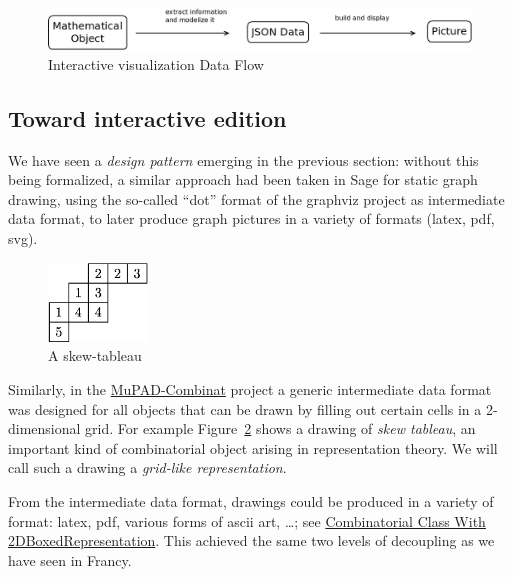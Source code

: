 \documentclass{deliverablereport}
\begin{document}
\begin{figure}[h]
  \begin{center}
    \includegraphics[width=\textwidth]{schemas/SensUnique}
  \end{center}
  \caption{Interactive visualization Data Flow}
  \label{fig:dataflow1}
\end{figure}




\subsection{Toward interactive edition}
\label{section:editing}

We have seen a \emph{design pattern} emerging in the previous section:
without this being formalized, a similar approach had been taken in
Sage for static graph drawing, using the so-called ``dot'' format of
the graphviz project as intermediate data format, to later produce
graph pictures in a variety of formats (latex, pdf, svg).

\begin{figure}
  \includegraphics[width=100px]{images/JDTSlide}
  \caption{A skew-tableau}
  \label{fig:skew_tableau}
\end{figure}
Similarly, in the
\href{http://mupad-combinat.sourceforge.net}{MuPAD-Combinat} project a
generic intermediate data format was designed for all objects that can
be drawn by filling out certain cells in a 2-dimensional grid. For
example Figure~\ref{fig:skew_tableau} shows a drawing of \emph{skew
  tableau}, an important kind of combinatorial object arising in
representation theory.
We will call such a drawing a \emph{grid-like representation}.


From the intermediate data format, drawings could be produced in a
variety of format: latex, pdf, various forms of ascii art, \dots; see
\href{http://mupad-combinat.sourceforge.net/doc/en/Cat_Combinat/CombinatorialClassWith2DBoxedRepresentation.html}{Combinatorial Class With 2DBoxedRepresentation}.
This achieved the same two levels of decoupling as we have seen in Francy.
\end{document}
